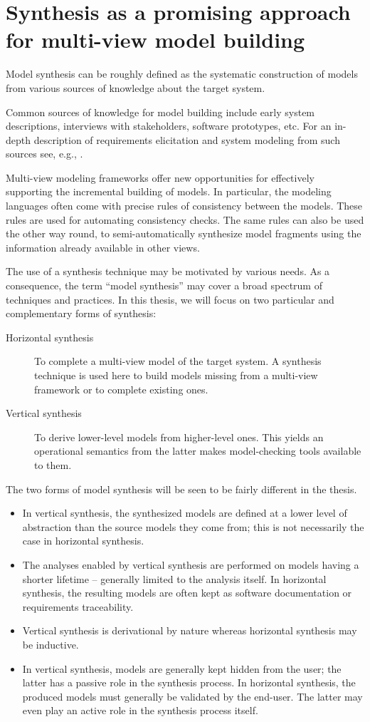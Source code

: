 \section{Synthesis as a promising approach for multi-view model building\label{section:intro-synthesis}}

Model synthesis can be roughly defined as the systematic construction of models from various sources of knowledge about the target system. 

Common sources of knowledge for model building include early system descriptions, interviews with stakeholders, software prototypes, etc. For an in-depth description of requirements elicitation and system modeling from such sources see, e.g., \cite{VanLamsweerde:2009}.

Multi-view modeling frameworks offer new opportunities for effectively supporting the incremental building of models. In particular, the modeling languages often come with precise rules of consistency between the models. These rules are used for automating consistency checks. The same rules can also be used the other way round, to semi-automatically synthesize model fragments using the information already available in other views.

The use of a synthesis technique may be motivated by various needs. As a consequence, the term ``model synthesis'' may cover a broad spectrum of techniques and practices. In this thesis, we will focus on two particular and complementary forms of synthesis:
\begin{description}
\item[Horizontal synthesis] To complete a multi-view model of the target system. A synthesis technique is used here to build models missing from a multi-view framework or to complete existing ones.
\item[Vertical synthesis] To derive lower-level models from higher-level ones. This yields an operational semantics from the latter makes model-checking tools available to them.
\end{description}

The two forms of model synthesis will be seen to be fairly different in the thesis.
\begin{itemize}
\item In vertical synthesis, the synthesized models are defined at a lower level of abstraction than the source models they come from; this is not necessarily the case in horizontal synthesis.
\item The analyses enabled by vertical synthesis are performed on models having a shorter lifetime -- generally limited to the analysis itself. In horizontal synthesis, the resulting models are often kept as software documentation or requirements traceability. 
\item Vertical synthesis is derivational by nature whereas horizontal synthesis may be inductive.
\item In vertical synthesis, models are generally kept hidden from the user; the latter has a passive role in the synthesis process. In horizontal synthesis, the produced models must generally be validated by the end-user. The latter may even play an active role in the synthesis process itself.
\end{itemize}

